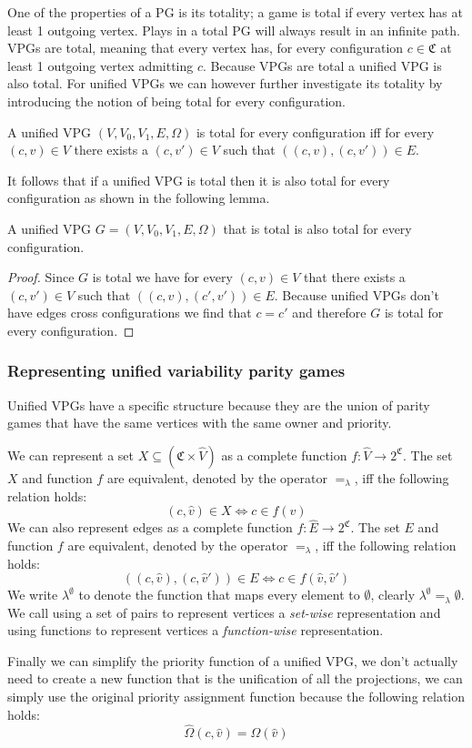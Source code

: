 One of the properties of a PG is its totality; a game is total if every vertex has at least 1 outgoing vertex. Plays in a total PG will always result in an infinite path. VPGs are total, meaning that every vertex has, for every configuration $c \in \mathfrak{C}$ at least 1 outgoing vertex admitting $c$. Because VPGs are total a unified VPG is also total. For unified VPGs we can however further investigate its totality by introducing the notion of being total for every configuration. 
\begin{definition}
	A unified VPG $(V,V_0,V_1,E,\Omega)$ is total for every configuration iff for every $(c,v) \in V$ there exists a $(c,v') \in V$ such that $((c,v),(c,v')) \in E$.
\end{definition}

It follows that if a unified VPG is total then it is also total for every configuration as shown in the following lemma.
\begin{lemma}
	\label{lem_UVPG_total}
	A unified VPG $G = (V,V_0,V_1,E,\Omega)$ that is total is also total for every configuration.
	\begin{proof}
		Since $G$ is total we have for every $(c,v) \in V$ that there exists a $(c,v') \in V$ such that $((c,v),(c',v')) \in E$. Because unified VPGs don't have edges cross configurations we find that $c = c'$ and therefore $G$ is total for every configuration.
	\end{proof}
\end{lemma}

\subsubsection{Representing unified variability parity games}
Unified VPGs have a specific structure because they are the union of parity games that have the same vertices with the same owner and priority.

We can represent a set $X \subseteq (\mathfrak{C} \times \hat{V})$ as a complete function $f : \hat{V} \rightarrow 2^\mathfrak{C}$. The set $X$ and function $f$ are equivalent, denoted by the operator $=_\lambda$, iff the following relation holds:
\[ (c,\hat{v}) \in X \iff c \in f(\hat{v}) \]
We can also represent edges as a complete function $f : \hat{E} \rightarrow 2^\mathfrak{C}$. The set $E$ and function $f$ are equivalent, denoted by the operator $=_\lambda$, iff the following relation holds:
\[ ((c,\hat{v}),(c,\hat{v}')) \in E \iff c \in f(\hat{v},\hat{v}') \]
We write $\lambda^\emptyset$ to denote the function that maps every element to $\emptyset$, clearly $\lambda^\emptyset =_\lambda \emptyset$. We call using a set of pairs to represent vertices a \textit{set-wise} representation and using functions to represent vertices a \textit{function-wise} representation.


Finally we can simplify the priority function of a unified VPG, we don't actually need to create a new function that is the unification of all the projections, we can simply use the original priority assignment function because the following relation holds:
\[ \hat{\Omega}(c,\hat{v}) = \Omega(\hat{v}) \]